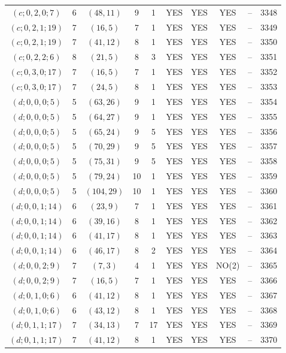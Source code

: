 \begin{longtable}{|c|c|c|c|c|c|c|c|c|c|}
$(c; 0, 2, 0; 7)$ & 6 & $(48, 11)$ & 9 & 1 & YES & YES & YES & -- & 3348\\
$(c; 0, 2, 1; 19)$ & 7 & $(16, 5)$ & 7 & 1 & YES & YES & YES & -- & 3349\\
$(c; 0, 2, 1; 19)$ & 7 & $(41, 12)$ & 8 & 1 & YES & YES & YES & -- & 3350\\
$(c; 0, 2, 2; 6)$ & 8 & $(21, 5)$ & 8 & 3 & YES & YES & YES & -- & 3351\\
$(c; 0, 3, 0; 17)$ & 7 & $(16, 5)$ & 7 & 1 & YES & YES & YES & -- & 3352\\
$(c; 0, 3, 0; 17)$ & 7 & $(24, 5)$ & 8 & 1 & YES & YES & YES & -- & 3353\\
$(d; 0, 0, 0; 5)$ & 5 & $(63, 26)$ & 9 & 1 & YES & YES & YES & -- & 3354\\
$(d; 0, 0, 0; 5)$ & 5 & $(64, 27)$ & 9 & 1 & YES & YES & YES & -- & 3355\\
$(d; 0, 0, 0; 5)$ & 5 & $(65, 24)$ & 9 & 5 & YES & YES & YES & -- & 3356\\
$(d; 0, 0, 0; 5)$ & 5 & $(70, 29)$ & 9 & 5 & YES & YES & YES & -- & 3357\\
$(d; 0, 0, 0; 5)$ & 5 & $(75, 31)$ & 9 & 5 & YES & YES & YES & -- & 3358\\
$(d; 0, 0, 0; 5)$ & 5 & $(79, 24)$ & 10 & 1 & YES & YES & YES & -- & 3359\\
$(d; 0, 0, 0; 5)$ & 5 & $(104, 29)$ & 10 & 1 & YES & YES & YES & -- & 3360\\
$(d; 0, 0, 1; 14)$ & 6 & $(23, 9)$ & 7 & 1 & YES & YES & YES & -- & 3361\\
$(d; 0, 0, 1; 14)$ & 6 & $(39, 16)$ & 8 & 1 & YES & YES & YES & -- & 3362\\
$(d; 0, 0, 1; 14)$ & 6 & $(41, 17)$ & 8 & 1 & YES & YES & YES & -- & 3363\\
$(d; 0, 0, 1; 14)$ & 6 & $(46, 17)$ & 8 & 2 & YES & YES & YES & -- & 3364\\
$(d; 0, 0, 2; 9)$ & 7 & $(7, 3)$ & 4 & 1 & YES & YES & NO(2) & -- & 3365\\
$(d; 0, 0, 2; 9)$ & 7 & $(16, 5)$ & 7 & 1 & YES & YES & YES & -- & 3366\\
$(d; 0, 1, 0; 6)$ & 6 & $(41, 12)$ & 8 & 1 & YES & YES & YES & -- & 3367\\
$(d; 0, 1, 0; 6)$ & 6 & $(43, 12)$ & 8 & 1 & YES & YES & YES & -- & 3368\\
$(d; 0, 1, 1; 17)$ & 7 & $(34, 13)$ & 7 & 17 & YES & YES & YES & -- & 3369\\
$(d; 0, 1, 1; 17)$ & 7 & $(41, 12)$ & 8 & 1 & YES & YES & YES & -- & 3370\\

\end{longtable}
